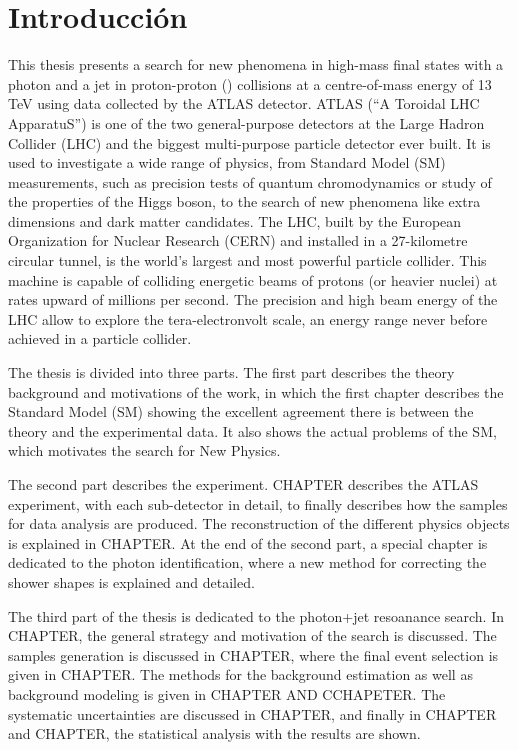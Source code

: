 \chapter*{Introducci\'on}

This thesis presents a search for new phenomena in high-mass final states with a photon and a jet in proton-proton (\pp) collisions at a centre-of-mass energy of 13 TeV using data collected by the \acs{ATLAS} detector. \acs{ATLAS} (“A Toroidal LHC ApparatuS”) is one of the two general-purpose detectors at the Large Hadron Collider (\acs{LHC}) and the biggest multi-purpose particle detector ever built. It is used to investigate a wide range of physics, from Standard Model (\acs{SM}) measurements, such as precision tests of quantum chromodynamics or study of the properties of the Higgs boson, to the search of new phenomena like extra dimensions and dark matter candidates. The LHC, built by the European Organization for Nuclear Research (\acs{CERN}) and installed in a 27-kilometre circular tunnel, is the world's largest and most powerful particle collider. This machine is capable of colliding energetic beams of protons (or heavier nuclei) at rates upward of millions per second. The precision and high beam energy of the LHC allow to explore the tera-electronvolt scale, an energy range never before achieved in a particle collider.



The thesis is divided into three parts. The first part describes the theory background and motivations of the work, in which the first chapter describes the Standard Model (SM) showing the excellent agreement there is between the theory and the experimental data. It also shows the actual problems of the SM, which motivates the search for New Physics.

The second part describes the experiment. CHAPTER describes the ATLAS experiment, with each sub-detector in detail, to finally describes how the samples for data analysis are produced. The reconstruction of the different physics objects is explained in CHAPTER. At the end of the second part, a special chapter is dedicated to the photon identification, where a new method for correcting the shower shapes is explained and detailed.

The third part of the thesis is dedicated to the photon+jet resoanance search.
In CHAPTER, the general strategy and motivation of the search is discussed. The samples generation is discussed in CHAPTER, where the final event selection is given in CHAPTER.
The methods for the background estimation as well as background modeling is given in CHAPTER AND CCHAPETER.
The systematic uncertainties are discussed in CHAPTER, and finally in CHAPTER and CHAPTER, the statistical analysis with the results are shown.

